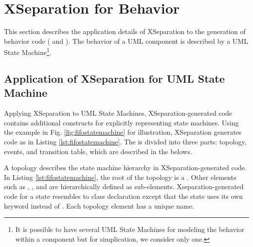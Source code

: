 \section{XSeparation for Behavior}
\label{sec:xseparationbehavior}
This section describes the application details of XSeparation to the generation of behavior code ( and ).
The behavior of a UML component is described by a UML State Machine\footnote{It is possible to have several UML State Machines for modeling the behavior within a component but for simplication, we consider only one.}.







\subsection{Application of XSeparation for UML State Machine}
Applying XSeparation to UML State Machines, XSeparation-generated code contains additional constructs for explicitly representing state machines.
Using the example in Fig. \ref{fig:fifostatemachine} for illustration, XSeparation generates code as in Listing \ref{lst:fifostatemachine}.
The  is divided into three parts: topology, events, and transition table, which are described in the belows.




\vskip 0.2cm
\noindent
{}
A topology describes the state machine hierarchy in XSeparation-generated code.
In Listing \ref{lst:fifostatemachine}, the root of the topology is a .
Other elements such as , , and  are hierarchically defined as sub-elements.
Xseparation-generated code for a state resembles to class declaration except that the state uses its own keyword  instead of .
Each topology element has a unique name.

